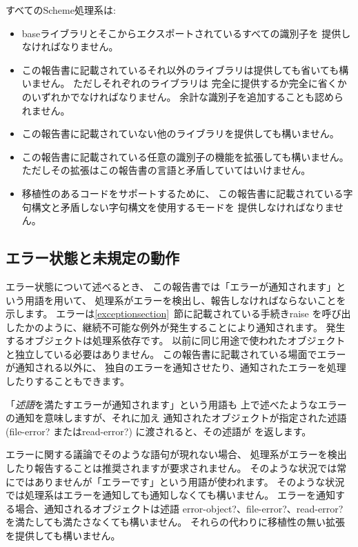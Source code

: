 すべてのScheme処理系は:
\begin{itemize}

\item baseライブラリとそこからエクスポートされているすべての識別子を
提供しなければなりません。

\item この報告書に記載されているそれ以外のライブラリは提供しても省いても構いません。
ただしそれぞれのライブラリは
完全に提供するか完全に省くかのいずれかでなければなりません。
余計な識別子を追加することも認められません。

\item この報告書に記載されていない他のライブラリを提供しても構いません。

\item この報告書に記載されている任意の識別子の機能を拡張しても構いません。
ただしその拡張はこの報告書の言語と矛盾していてはいけません。

\item 移植性のあるコードをサポートするために、
この報告書に記載されている字句構文と矛盾しない字句構文を使用するモードを
提供しなければなりません。
\end{itemize}

\subsection{エラー状態と未規定の動作}
\label{errorsituations}

エラー状態について述べるとき、
この報告書では「エラーが通知されます」という用語を用いて、
処理系がエラーを検出し、報告しなければならないことを示します。
エラーは\ref{exceptionsection}~節に記載されている手続き{\cf raise}
を呼び出したかのように、継続不可能な例外が発生することにより通知されます。
発生するオブジェクトは処理系依存です。
以前に同じ用途で使われたオブジェクトと独立している必要はありません。
この報告書に記載されている場面でエラーが通知される以外に、
独自のエラーを通知させたり、通知されたエラーを処理したりすることもできます。

「{\em 述語}を満たすエラーが通知されます」という用語も
上で述べたようなエラーの通知を意味しますが、それに加え
通知されたオブジェクトが指定された述語({\cf file-error?} または{\cf read-error?})
に渡されると、その述語が \schtrue{} を返します。

\vest エラーに関する議論でそのような語句が現れない場合、
処理系がエラーを検出したり報告することは推奨されますが要求されません。
そのような状況では常にではありませんが「エラーです」という用語が使われます。
そのような状況では処理系はエラーを通知しても通知しなくても構いません。
エラーを通知する場合、通知されるオブジェクトは述語
{\cf error-object?}、{\cf file-error?}、{\cf read-error?} 
を満たしても満たさなくても構いません。
それらの代わりに移植性の無い拡張を提供しても構いません。

